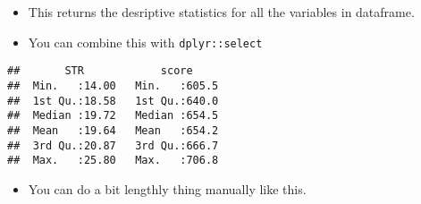 \documentclass[]{book}
\newenvironment{Shaded}{\begin{snugshade}}{\end{snugshade}}
\newcommand{\KeywordTok}[1]{\textcolor[rgb]{0.13,0.29,0.53}{\textbf{#1}}}
\newcommand{\NormalTok}[1]{#1}
\newcommand{\OperatorTok}[1]{\textcolor[rgb]{0.81,0.36,0.00}{\textbf{#1}}}
\newcommand{\StringTok}[1]{\textcolor[rgb]{0.31,0.60,0.02}{#1}}
\providecommand{\tightlist}{%
  \setlength{\itemsep}{0pt}\setlength{\parskip}{0pt}}
\begin{document}
\begin{itemize}
\tightlist
\item
  This returns the desriptive statistics for all the variables in dataframe.
\item
  You can combine this with \texttt{dplyr::select}
\end{itemize}

\begin{Shaded}
\end{Shaded}

\begin{verbatim}
##       STR            score      
##  Min.   :14.00   Min.   :605.5  
##  1st Qu.:18.58   1st Qu.:640.0  
##  Median :19.72   Median :654.5  
##  Mean   :19.64   Mean   :654.2  
##  3rd Qu.:20.87   3rd Qu.:666.7  
##  Max.   :25.80   Max.   :706.8
\end{verbatim}

\begin{itemize}
\tightlist
\item
  You can do a bit lengthly thing manually like this.
\end{itemize}
\end{document}
